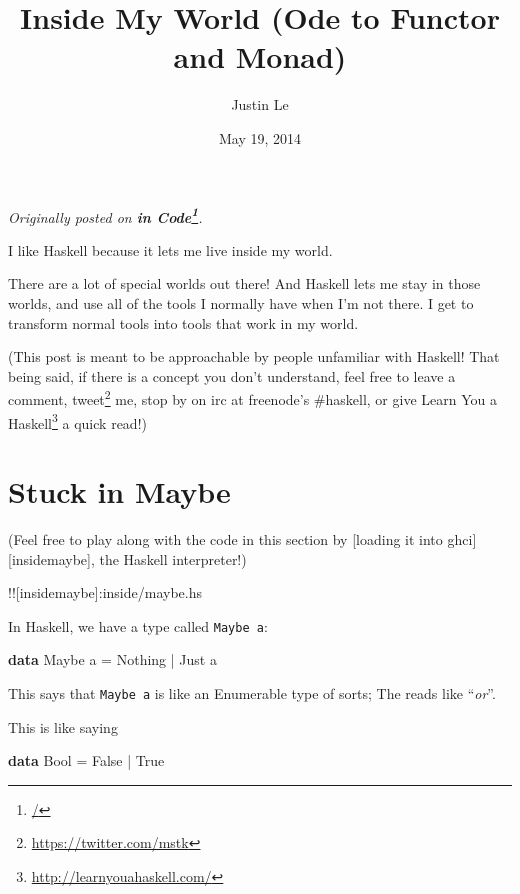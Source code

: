 \documentclass[]{article}
\title{Inside My World (Ode to Functor and Monad)}
\author{Justin Le}
\date{May 19, 2014}
\newenvironment{Shaded}{}{}
\newcommand{\KeywordTok}[1]{\textcolor[rgb]{0.00,0.44,0.13}{\textbf{{#1}}}}
\newcommand{\DataTypeTok}[1]{\textcolor[rgb]{0.56,0.13,0.00}{{#1}}}
\newcommand{\FunctionTok}[1]{\textcolor[rgb]{0.02,0.16,0.49}{{#1}}}
\newcommand{\NormalTok}[1]{{#1}}
\renewcommand{\href}[2]{#2\footnote{\url{#1}}}
\begin{document}
\maketitle

\emph{Originally posted on \textbf{\href{/}{in Code}}.}

I like Haskell because it lets me live inside my world.

There are a lot of special worlds out there! And Haskell lets me stay in
those worlds, and use all of the tools I normally have when I'm not
there. I get to transform normal tools into tools that work in my world.

(This post is meant to be approachable by people unfamiliar with
Haskell! That being said, if there is a concept you don't understand,
feel free to leave a comment, \href{https://twitter.com/mstk}{tweet} me,
stop by on irc at freenode's \#haskell, or give
\href{http://learnyouahaskell.com/}{Learn You a Haskell} a quick read!)

\section{Stuck in Maybe}\label{stuck-in-maybe}

(Feel free to play along with the code in this section by {[}loading it
into ghci{]}{[}insidemaybe{]}, the Haskell interpreter!)

!!{[}insidemaybe{]}:inside/maybe.hs

In Haskell, we have a type called \texttt{Maybe\ a}:

\begin{Shaded}
\begin{Highlighting}[]
\KeywordTok{data} \DataTypeTok{Maybe} \NormalTok{a }\FunctionTok{=} \DataTypeTok{Nothing} \FunctionTok{|} \DataTypeTok{Just} \NormalTok{a}
\end{Highlighting}
\end{Shaded}

This says that \texttt{Maybe\ a} is like an Enumerable type of sorts;
The \texttt{\textbar{}} reads like ``\emph{or}''.

This is like saying

\begin{Shaded}
\begin{Highlighting}[]
\KeywordTok{data} \DataTypeTok{Bool} \FunctionTok{=} \DataTypeTok{False} \FunctionTok{|} \DataTypeTok{True}
\end{Highlighting}
\end{Shaded}
\end{document}
